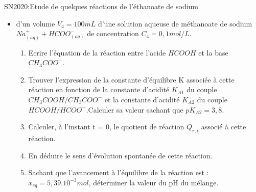 \documentclass[12pt]{article}
\begin{document}
\begin{Box2}{SN2020:Etude de quelques réactions de l’éthanoate de sodium}
\begin{itemize}
        \item d'un volume $V_4 = 100mL$ d’une solution aqueuse de méthanoate de sodium $Na^+_{(aq)} + HCOO^-_{(aq)}$ de concentration $C_4=0,1mol/L$.

          \begin{enumerate}
            \item  Ecrire l’équation de la réaction entre l’acide $HCOOH$ et la base $CH_3COO^-$.
            \item Trouver l’expression de la constante d’équilibre K associée à cette réaction en fonction de la constante d’acidité $K_{A1}$ du couple $CH_3COOH /CH_3COO^-$  et la constante d'acidité $K_{A2}$ du couple $HCOOH / HCOO^-$.Calculer sa valeur sachant que $pK_{A2} = 3,8$.
            \item Calculer, à l’instant t = 0, le quotient de réaction $Q_{r,i}$ associé à cette réaction.
            \item En déduire le sens d’évolution spontanée de cette réaction.
            \item Sachant que l’avancement à l’équilibre de la réaction est :$x_{eq} = 5,39.10^{-3}mol$, déterminer la
valeur du pH du mélange.

          \end{enumerate}
  \end{itemize}
\end{Box2}
\end{document}

